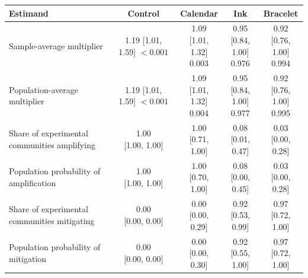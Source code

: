 \centering
\begin{tabular}{lcccc}
\toprule
Estimand & Control & Calendar & Ink & Bracelet \\
\midrule
Sample-average multiplier & \makecell[c]{1.19\\{[1.01, 1.59]}\\$<0.001$} & \makecell[c]{1.09\\{[1.01, 1.32]}\\0.003} & \makecell[c]{0.95\\{[0.84, 1.00]}\\0.976} & \makecell[c]{0.92\\{[0.76, 1.00]}\\0.994} \\
Population-average multiplier & \makecell[c]{1.19\\{[1.01, 1.59]}\\$<0.001$} & \makecell[c]{1.09\\{[1.01, 1.32]}\\0.004} & \makecell[c]{0.95\\{[0.84, 1.00]}\\0.977} & \makecell[c]{0.92\\{[0.76, 1.00]}\\0.995} \\
Share of experimental communities amplifying & \makecell[c]{1.00\\{[1.00, 1.00]}} & \makecell[c]{1.00\\{[0.71, 1.00]}} & \makecell[c]{0.08\\{[0.01, 0.47]}} & \makecell[c]{0.03\\{[0.00, 0.28]}} \\
Population probability of amplification & \makecell[c]{1.00\\{[1.00, 1.00]}} & \makecell[c]{1.00\\{[0.70, 1.00]}} & \makecell[c]{0.08\\{[0.00, 0.45]}} & \makecell[c]{0.03\\{[0.00, 0.28]}} \\
Share of experimental communities mitigating & \makecell[c]{0.00\\{[0.00, 0.00]}} & \makecell[c]{0.00\\{[0.00, 0.29]}} & \makecell[c]{0.92\\{[0.53, 0.99]}} & \makecell[c]{0.97\\{[0.72, 1.00]}} \\
Population probability of mitigation & \makecell[c]{0.00\\{[0.00, 0.00]}} & \makecell[c]{0.00\\{[0.00, 0.30]}} & \makecell[c]{0.92\\{[0.55, 1.00]}} & \makecell[c]{0.97\\{[0.72, 1.00]}} \\
\bottomrule
\end{tabular}
